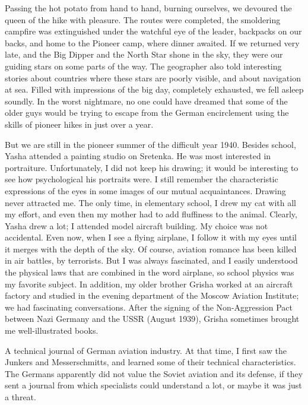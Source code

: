 \label{19-1}
Passing the hot potato from hand to hand, burning ourselves, we devoured the queen of the hike with pleasure. The routes were completed, the smoldering campfire was extinguished under the watchful eye of the leader, backpacks on our backs, and home to the Pioneer camp, where dinner awaited. If we returned very late, and the Big Dipper and the North Star shone in the sky, they were our guiding stars on some parts of the way. The geographer also told interesting stories about countries where these stars are poorly visible, and about navigation at sea. Filled with impressions of the big day, completely exhausted, we fell asleep soundly. In the worst nightmare, no one could have dreamed that some of the older guys would be trying to escape from the German encirclement using the skills of pioneer hikes in just over a year.

\label{20-1}
But we are still in the pioneer summer of the difficult year 1940. Besides school, Yasha attended a painting studio on Sretenka. He was most interested in portraiture. Unfortunately, I did not keep his drawing; it would be interesting to see how psychological his portraits were. I still remember the characteristic expressions of the eyes in some images of our mutual acquaintances. Drawing never attracted me. The only time, in elementary school, I drew my cat with all my effort, and even then my mother had to add fluffiness to the animal. Clearly, Yasha drew a lot; I attended model aircraft building. My choice was not accidental. Even now, when I see a flying airplane, I follow it with my eyes until it merges with the depth of the sky. Of course, aviation romance has been killed in air battles, by terrorists. But I was always fascinated, and I easily understood the physical laws that are combined in the word airplane, so school physics was my favorite subject. In addition, my older brother Grisha worked at an aircraft factory and studied in the evening department of the Moscow Aviation Institute; we had fascinating conversations. After the signing of the Non-Aggression Pact between Nazi Germany and the USSR (August 1939), Grisha sometimes brought me well-illustrated books.

\label{21-1}
A technical journal of German aviation industry. At that time, I first saw the Junkers and Messerschmitts, and learned some of their technical characteristics. The Germans apparently did not value the Soviet aviation and its defense, if they sent a journal from which specialists could understand a lot, or maybe it was just a threat.

